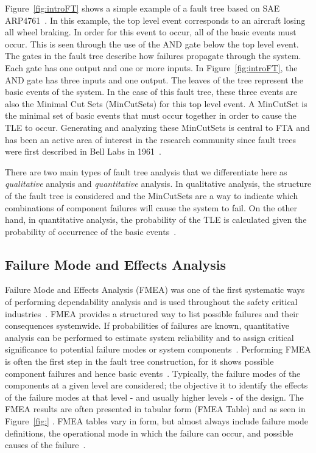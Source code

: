 Figure~\ref{fig:introFT} shows a simple example of a fault tree based on SAE ARP4761~\cite{SAE:ARP4761}. In this example, the top level event corresponds to an aircraft losing all wheel braking. In order for this event to occur, all of the basic events must occur. This is seen through the use of the AND gate below the top level event. The gates in the fault tree describe how failures propagate through the system. Each gate has one output and one or more inputs. In Figure~\ref{fig:introFT}, the AND gate has three inputs and one output. The leaves of the tree represent the basic events of the system. %
In the case of this fault tree, these three events are also the Minimal Cut Sets (MinCutSets) for this top level event. A MinCutSet is the minimal set of basic events that must occur together in order to cause the TLE to occur. Generating and analyzing these MinCutSets is central to FTA and has been an active area of interest in the research community since fault trees were first described in Bell Labs in 1961~\cite{historyFTA,0f356f05e72f43018211b36f97c8854a}. 

There are two main types of fault tree analysis that we differentiate here as \textit{qualitative} analysis and \textit{quantitative} analysis. In qualitative analysis, the structure of the fault tree is considered and the MinCutSets are a way to indicate which combinations of component failures will cause the system to fail. On the other hand, in quantitative analysis, the probability of the TLE is calculated given the probability of occurrence of the basic events~\cite{0f356f05e72f43018211b36f97c8854a}. 

\subsection{Failure Mode and Effects Analysis}
Failure Mode and Effects Analysis (FMEA) was one of the first systematic ways of performing dependability analysis and is used throughout the safety critical industries~\cite{rausand2003system,Bozzano:2011:SDP:1992983.1992988}. FMEA provides a structured way to list possible failures and their consequences systemwide. If probabilities of failures are known, quantitative analysis can be performed to estimate system reliability and to assign critical significance to potential failure modes or system components~\cite{MilStandardFMEA}. Performing FMEA is often the first step in the fault tree construction, for it shows possible component failures and hence basic events~\cite{0f356f05e72f43018211b36f97c8854a}. Typically, the failure modes of the components at a given level are considered; the objective it to identify the effects of the failure modes at that level - and usually higher levels - of the design. The FMEA results are often presented in tabular form (FMEA Table) and as seen in Figure~\ref{fig:} . FMEA tables vary in form, but almost always include failure mode definitions, the operational mode in which the failure can occur, and possible causes of the failure~\cite{Bozzano:2010:DSA:1951720}.

